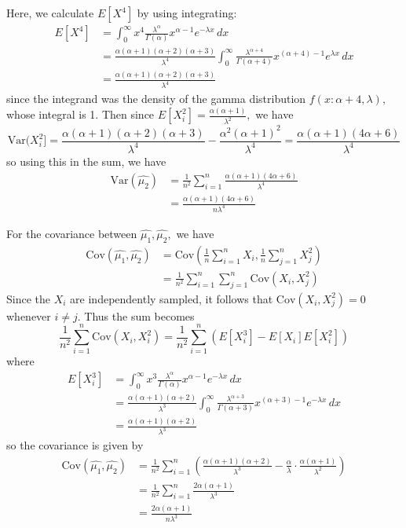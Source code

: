 \documentclass{article}
\newcommand{\var}{\mathrm{Var}}
\newcommand{\cov}{\mathrm{Cov}}
\begin{document}
\begin{enumerate}
\begin{enumerate}[(a)]
\begin{soln}
					Here, we calculate $E[X^4]$ by using integrating:
					\begin{align*}
						E[X^4] &= \int_0^\infty x^4 \frac{\lambda^\alpha}{\Gamma(\alpha)}x^{\alpha-1}e^{-\lambda x}\, dx \\
						&= \frac{\alpha(\alpha+1)(\alpha+2)(\alpha+3)}{\lambda^4}\int_0^{\infty} \frac{\lambda^{\alpha+4}}{\Gamma(\alpha+4)} x^{(\alpha+4)-1}e^{\lambda x}\, dx \\
						&= \frac{\alpha(\alpha+1)(\alpha+2)(\alpha+3)}{\lambda^4}
					\end{align*} since the integrand was the density of the gamma distribution $f(x:\alpha+4, \lambda),$ whose integral is 1. Then since $E[X_i^2]=\frac{\alpha(\alpha+1)}{\lambda^2},$ we have \[\var(X_i^2] = \frac{\alpha(\alpha+1)(\alpha+2)(\alpha+3)}{\lambda^4} - \frac{\alpha^2(\alpha+1)^2}{\lambda^4} = \frac{\alpha(\alpha+1)(4\alpha+6)}{\lambda^4}\] so using this in the sum, we have 
					\begin{align*}
						\var(\hat{\mu_2}) &= \frac{1}{n^2}\sum_{i=1}^{n}\frac{\alpha(\alpha+1)(4\alpha+6)}{\lambda^4} \\
						&= \boxed{\frac{\alpha(\alpha+1)(4\alpha+6)}{n\lambda^4}}
					\end{align*}

					For the covariance between $\hat{\mu_1}, \hat{\mu_2},$ we have 
					\begin{align*}
						\cov(\hat{\mu_1}, \hat{\mu_2}) &= \cov\left( \frac{1}{n}\sum_{i=1}^{n} X_i, \frac{1}{n}\sum_{j=1}^{n} X_j^2 \right) \\
						&= \frac{1}{n^2}\sum_{i=1}^{n} \sum_{j=1}^{n} \cov(X_i, X_j^2)
					\end{align*} Since the $X_i$ are independently sampled, it follows that $\cov(X_i, X_j^2)=0$ whenever $i\neq j.$ Thus the sum becomes \[\frac{1}{n^2}\sum_{i=1}^{n} \cov(X_i, X_i^2)=\frac{1}{n^2}\sum_{i=1}^{n} (E[X_i^3]-E[X_i]E[X_i^2])\] where 
					\begin{align*}
						E[X_i^3] &= \int_0^\infty x^3 \frac{\lambda^\alpha}{\Gamma(\alpha)}x^{\alpha-1} e^{-\lambda x}\, dx \\
						&= \frac{\alpha(\alpha+1)(\alpha+2)}{\lambda^3}\int_0^\infty \frac{\lambda^{\alpha+3}}{\Gamma(\alpha+3)} x^{(\alpha+3)-1} e^{-\lambda x}\, dx \\
						&= \frac{\alpha(\alpha+1)(\alpha+2)}{\lambda^3}
					\end{align*} so the covariance is given by
					\begin{align*}
						\cov(\hat{\mu_1}, \hat{\mu_2}) &= \frac{1}{n^2}\sum_{i=1}^{n} \left( \frac{\alpha(\alpha+1)(\alpha+2)}{\lambda^3}-\frac{\alpha}{\lambda}\cdot\frac{\alpha(\alpha+1)}{\lambda^2}  \right) \\
						&= \frac{1}{n^2}\sum_{i=1}^{n}\frac{2\alpha(\alpha+1)}{\lambda^3} \\
						&= \boxed{\frac{2\alpha(\alpha+1)}{n\lambda^3}}
					\end{align*}


\end{soln}
\end{enumerate}
\end{enumerate}
\end{document}
